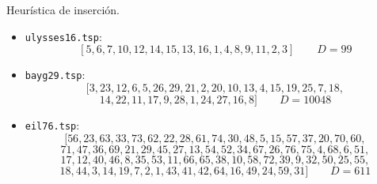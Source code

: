 \documentclass[10pt, xcolor=table]{beamer}
\begin{document}
\begin{frame}[fragile]{Heurística de inserción. }
\begin{itemize}
	\item \texttt{ulysses16.tsp}:
	\[
		[5, 6, 7, 10, 12, 14, 15, 13, 16, 1, 4, 8, 9, 11, 2, 3]	\qquad D = 99
	\]		

	\item \texttt{bayg29.tsp}:
	\[
		[3, 23, 12, 6, 5, 26, 29, 21, 2, 20, 10, 13, 4, 15, 19, 25, 7, 18,
		\]
		\[
		 14, 22, 11, 17, 9, 28, 1, 24, 27, 16, 8] \qquad D = 10048
	\]
	
	\item \texttt{eil76.tsp}:
	\[
		[56, 23, 63, 33, 73, 62, 22, 28, 61, 74, 30, 48, 5, 15, 57, 37, 20, 70, 60,
	\]
	\[
	 71, 47, 36, 69, 21, 29, 45, 27, 13, 54, 52, 34, 67, 26, 76, 75, 4, 68, 6, 51,
	 \]
	\[
	 17, 12, 40, 46, 8, 35, 53, 11, 66, 65, 38, 10, 58, 72, 39, 9, 32, 50, 25, 55,
	 \]
	\[
	 18, 44, 3, 14, 19, 7, 2, 1, 43, 41, 42, 64, 16, 49, 24, 59, 31] \qquad D = 611
	\]
\end{itemize}
\end{frame}
\end{document}
